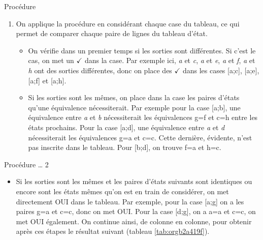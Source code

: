 \documentclass[presentation]{beamer}
\begin{document}
\begin{frame}[label={sec:org958f64e}]{Procédure}
\begin{enumerate}
\item On applique la procédure en considérant chaque case du tableau, ce
qui permet de comparer chaque paire de lignes du tableau d'état.

\begin{itemize}
\item On vérifie dans un premier temps si les sorties sont
différentes. Si c'est le cas, on met un \(\checkmark\) dans la
case. Par exemple ici, \emph{a} et \emph{c}, \emph{a} et \emph{e}, \emph{a} et \emph{f}, \emph{a} et
\emph{h} ont des sorties différentes, donc on place des \(\checkmark\)
dans les cases [a;c], [a;e], [a;f] et [a;h].
\item Si les sorties sont les mêmes, on place dans la case les paires
d'états qu'une équivalence nécessiterait. Par exemple pour la
case [a;b], une équivalence entre \emph{a} et \emph{b} nécessiterait les
équivalences g=f et c=h entre les états prochains. Pour la case
[a;d], une équivalence entre \emph{a} et \emph{d} nécessiterait les
équivalences g=a et c=c. Cette dernière, évidente, n'est pas
inscrite dans le tableau. Pour [b;d], on trouve f=a et h=c.
\end{itemize}
\end{enumerate}
\end{frame}

\begin{frame}[label={sec:org2700188}]{Procédure \ldots{} 2}
\begin{itemize}
\item Si les sorties sont les mêmes et les paires d'états suivants sont
identiques ou encore sont les états mêmes qu'on est en train de
considérer, on met directement OUI dans le tableau. Par exemple,
pour la case [a;g] on a les paires g=a et c=c, donc on met
OUI. Pour la case [d;g], on a a=a et c=c, on met OUI
également. On continue ainsi, de colonne en colonne, pour obtenir
après ces étapes le résultat suivant (tableau \ref{tab:orgb2a419f}).
\end{itemize}
\end{frame}
\end{document}
